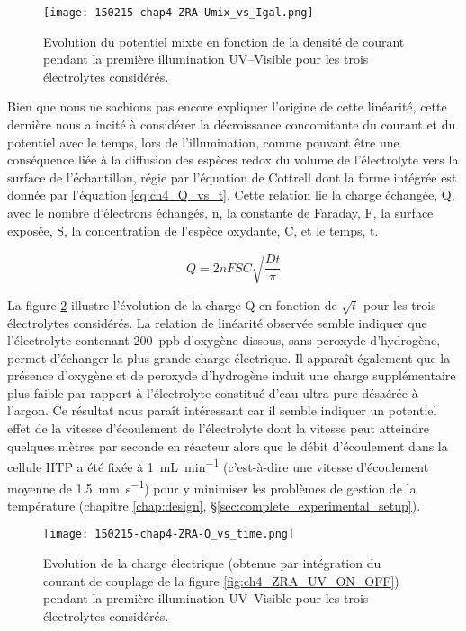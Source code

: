 \begin{refsection}
    \begin{figure}[H]
        \centering
        \texttt{[image: 150215-chap4-ZRA-Umix\_vs\_Igal.png]}
        \caption{Evolution du potentiel mixte en fonction de la densité de courant pendant la première illumination
        UV--Visible pour les trois électrolytes considérés.}
        \label{fig:ch4_Umix_vs_jgal}
    \end{figure}

    Bien que nous ne sachions pas encore expliquer l’origine de cette linéarité, cette dernière nous a incité
    à considérer la décroissance concomitante du courant et du potentiel avec le temps, lors de l'illumination, 
    comme pouvant être une conséquence liée à la
    diffusion des espèces redox du volume de l’électrolyte vers la surface de l’échantillon, régie par l’équation de
    Cottrell dont la forme intégrée est donnée par l’équation \ref{eq:ch4_Q_vs_t}. Cette relation lie la charge échangée, Q, avec le
    nombre d’électrons échangés, n, la constante de Faraday, F, la surface exposée, S, la concentration de l’espèce
    oxydante, C, et le temps, t.

    \begin{equation}
        Q = 2nFSC\sqrt{\frac{Dt}{\pi}}
        \label{eq:ch4_Q_vs_t}
    \end{equation}

    La figure \ref{fig:ch4_Q_UV} illustre l’évolution de la charge Q en fonction de $\sqrt{t}$ pour les trois électrolytes considérés.
    La relation
    de linéarité observée semble indiquer que l’électrolyte contenant 200~ppb d’oxygène dissous, sans peroxyde d’hydrogène,
    permet d’échanger la plus grande charge électrique. Il apparaît également que la présence d’oxygène et de peroxyde
    d’hydrogène induit une charge supplémentaire plus faible par rapport à l’électrolyte constitué d’eau ultra pure désaérée
    à l’argon. Ce résultat nous paraît intéressant car il semble indiquer un potentiel effet de la vitesse d’écoulement de
    l’électrolyte dont la vitesse peut atteindre quelques mètres par seconde en réacteur alors que le débit
    d’écoulement dans la cellule HTP a été fixée à \SI{1}{\milli\liter\per\minute} 
    (c’est-à-dire une vitesse d’écoulement moyenne de \SI{1.5}{\milli\meter\per\second})
    pour y minimiser les problèmes de gestion de la température (chapitre \ref{chap:design}, \S \ref{sec:complete_experimental_setup}). 

    \begin{figure}[H]
        \centering
        \texttt{[image: 150215-chap4-ZRA-Q\_vs\_time.png]}
        \caption{Evolution de la charge électrique (obtenue par intégration du courant de couplage de la figure \ref{fig:ch4_ZRA_UV_ON_OFF})
        pendant la première illumination UV--Visible pour les trois électrolytes considérés.}
        \label{fig:ch4_Q_UV}
    \end{figure}


\end{refsection}
